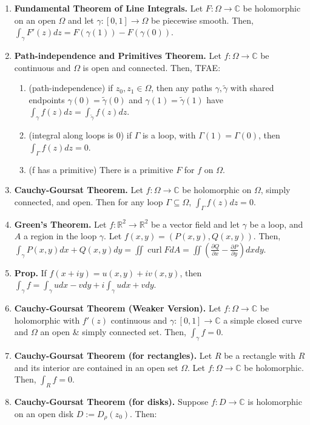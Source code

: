 \documentclass[12pt]{article}
\theoremstyle{definition}
\theoremstyle{named}
\DeclareMathOperator{\curl}{curl}
\begin{document}
{\begin{multicols}{2}
\begin{spacing}{1.01}
\begin{enumerate}
    \item \textbf{Fundamental Theorem of Line Integrals. } Let $F: \Omega \to \mathbb{C}$ be holomorphic on an open $\Omega$ and let $\gamma: [0,1] \to \Omega$ be piecewise smooth. Then, $\int_{\gamma} F'(z) dz = F(\gamma(1)) - F(\gamma(0))$. 
    \item \textbf{Path-independence and Primitives Theorem. } Let $f: \Omega \to \mathbb{C}$ be continuous and $\Omega$ is open and connected. Then, TFAE: 
    \begin{enumerate}
        \item (path-independence) if $z_0, z_1 \in \Omega$, then any paths $\gamma, \tilde{\gamma}$ with shared endpoints $\gamma(0) = \tilde{\gamma}(0)$ and $\gamma(1) = \tilde{\gamma}(1)$ have $\int_{\gamma} f(z) dz = \int_{\tilde{\gamma}} f(z) dz$. 
        \item (integral along loops is 0) if $\Gamma$ is a loop, with $\Gamma(1) = \Gamma(0)$, then $\int_{\Gamma} f(z) dz = 0$. 
        \item (f has a primitive) There is a primitive $F$ for $f$ on $\Omega$.  
    \end{enumerate}
    \item \textbf{Cauchy-Goursat Theorem. } Let $f: \Omega \to \mathbb{C}$ be holomorphic on $\Omega$, simply connected, and open. Then for any loop $\Gamma \subseteq \Omega$, $\int_{\Gamma} f(z) dz = 0$. 
    \item \textbf{Green's Theorem. } Let $f: \mathbb{R}^2 \to \mathbb{R}^2$ be a vector field and let $\gamma$ be a loop, and $A$ a region in the loop $\gamma$. Let $f(x,y) = (P(x,y), Q(x,y))$. Then, $\int_{\gamma} P(x,y) dx + Q(x,y) dy = \iint \curl F  dA = \iint \left(\frac{\partial Q}{\partial x} - \frac{\partial P}{\partial y}\right) dxdy$. 
    \item \textbf{Prop. } If $f(x+iy) = u(x,y) + iv(x,y)$, then $\int_{\gamma} f = \int_{\gamma} udx - vdy + i\int_\gamma u dx + vdy$. 
    \item \textbf{Cauchy-Goursat Theorem (Weaker Version). } Let $f: \Omega \to \mathbb{C}$ be holomorphic with $f'(z)$ continuous and $\gamma: [0,1] \to \mathbb{C}$ a simple closed curve and $\Omega$ an open \& simply connected set. Then, $\int_\gamma f = 0$. 
    \item \textbf{Cauchy-Goursat Theorem (for rectangles). } Let $R$ be a rectangle with $R$ and its interior are contained in an open set $\Omega$. Let $f: \Omega \to \mathbb{C}$ be holomorphic. Then, $\int_R f = 0$. 
    \item \textbf{Cauchy-Goursat Theorem (for disks). } Suppose $f: D \to \mathbb{C}$ is holomorphic on an open disk $D := D_\rho(z_0)$. Then: 

\end{enumerate}
\end{spacing}
\end{multicols}}
\end{document}
